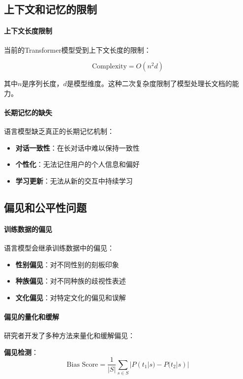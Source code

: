 \subsection{上下文和记忆的限制}

\paragraph{上下文长度限制}
当前的Transformer模型受到上下文长度的限制：

$$\text{Complexity} = O(n^2 d)$$

其中$n$是序列长度，$d$是模型维度。这种二次复杂度限制了模型处理长文档的能力。

\paragraph{长期记忆的缺失}
语言模型缺乏真正的长期记忆机制：
\begin{itemize}
\item \textbf{对话一致性}：在长对话中难以保持一致性
\item \textbf{个性化}：无法记住用户的个人信息和偏好
\item \textbf{学习更新}：无法从新的交互中持续学习
\end{itemize}

\subsection{偏见和公平性问题}

\paragraph{训练数据的偏见}
语言模型会继承训练数据中的偏见：

\begin{itemize}
\item \textbf{性别偏见}：对不同性别的刻板印象
\item \textbf{种族偏见}：对不同种族的歧视性表述
\item \textbf{文化偏见}：对特定文化的偏见和误解
\end{itemize}

\paragraph{偏见的量化和缓解}
研究者开发了多种方法来量化和缓解偏见：

\textbf{偏见检测}：
$$\text{Bias Score} = \frac{1}{|S|} \sum_{s \in S} |P(t_1|s) - P(t_2|s)|$$

